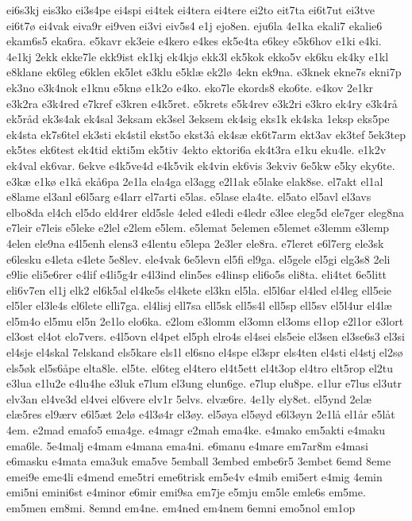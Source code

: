 {ei6s3kj
eis3ko
ei3s4pe
ei4spi
ei4tek
ei4tera
ei4tere
ei2to
eit7ta
ei6t7ut
ei3tve
ei6t7ø
ei4vak
eiva9r
ei9ven
ei3vi
eiv5s4
e1j
ejo8en.
eju6la
4e1ka
ekali7
ekalie6
ekam6s5
eka6ra.
e5kavr
ek3eie
e4kero
e4kes
ek5e4ta
e6key
e5k6hov
e1ki
e4ki.
4e1kj
2ekk
ekke7le
ekk9ist
ek1kj
ek4kjø
ekk3l
ek5kok
ekko5v
ek6ku
ek4ky
e1kl
e8klane
ek6leg
e6klen
ek5let
e3klu
e5klæ
ek2lø
4ekn
ek9na.
e3knek
ekne7s
ekni7p
ek3no
e3k4nok
e1knu
e5knø
e1k2o
e4ko.
eko7le
ekords8
eko6te.
e4kov
2e1kr
e3k2ra
e3k4red
e7kref
e3kren
e4k5ret.
e5krets
e5k4rev
e3k2ri
e3kro
ek4ry
e3k4rå
ek5råd
ek3s4ak
ek4sal
3eksam
ek3sel
3eksem
ek4sig
eks1k
ek4ska
1eksp
eks5pe
ek4sta
ek7s6tel
ek3sti
ek4stil
ekst5o
ekst3å
ek4sæ
ek6t7arm
ekt3av
ek3tef
5ek3tep
ek5tes
ek6test
ek4tid
ekti5m
ek5tiv
4ekto
ektori6a
ek4t3ra
e1ku
eku4le.
e1k2v
ek4val
ek6var.
6ekve
e4k5ve4d
e4k5vik
ek4vin
ek6vis
3ekviv
6e5kw
e5ky
eky6te.
e3kæ
e1kø
e1kå
ekå6pa
2e1la
ela4ga
el3agg
e2l1ak
e5lake
elak8se.
el7akt
el1al
e8lame
el3anl
e6l5arg
e4larr
el7arti
e5las.
e5lase
ela4te.
el5ato
el5avl
el3avs
elbo8da
el4ch
el5do
eld4rer
eld5sle
4eled
e4ledi
e4ledr
e3lee
eleg5d
ele7ger
eleg8na
e7leir
e7leis
e5leke
e2lel
e2lem
e5lem.
e5lemat
5elemen
e5lemet
e3lemm
e3lemp
4elen
ele9na
e4l5enh
elens3
e4lentu
e5lepa
2e3ler
ele8ra.
e7leret
e6l7erg
ele3sk
e6lesku
e4leta
e4lete
5e8lev.
ele4vak
6e5levn
el5fi
el9ga.
el5gele
el5gi
elg3s8
2eli
e9lie
eli5e6rer
e4lif
e4li5g4r
e4l3ind
elin5es
e4linsp
eli6o5s
eli8ta.
eli4tet
6e5litt
eli6v7en
el1j
elk2
el6k5al
el4ke5s
el4kete
el3kn
el5la.
el5l6ar
el4led
el4leg
ell5eie
el5ler
el3le4s
el6lete
elli7ga.
el4lisj
ell7sa
ell5sk
ell5s4l
ell5sp
ell5sv
el5l4ur
el4læ
el5m4o
el5mu
el5n
2e1lo
elo6ka.
e2lom
e3lomm
el3omn
el3oms
el1op
e2l1or
e3lort
el3ost
el4ot
elo7vers.
e4l5ovn
el4pet
el5ph
elro4s
el4sei
els5eie
el3sen
el3se6s3
el3si
el4sje
el4skal
7elskand
els5kare
els1l
el6sno
el4spe
el3spr
els4ten
el4sti
el4stj
el2sø
els5øk
el5s6åpe
elta8le.
el5te.
el6teg
el4tero
el4t5ett
el4t3op
el4tro
elt5rop
el2tu
e3lua
e1lu2e
e4lu4he
e3luk
e7lum
el3ung
elun6ge.
e7lup
elu8pe.
e1lur
e7lus
el3utr
elv3an
el4ve3d
el4vei
el6vere
elv1r
5elvs.
elvæ6re.
4e1ly
ely8et.
el5ynd
2elæ
elæ5res
el9ærv
e6l5æt
2elø
e4l3ø4r
el3øy.
el5øya
el5øyd
e6l3øyn
2e1lå
el1år
e5låt
4em.
e2mad
emafo5
ema4ge.
e4magr
e2mah
ema4ke.
e4mako
em5akti
e4maku
ema6le.
5e4malj
e4mam
e4mana
ema4ni.
e6manu
e4mare
em7ar8m
e4masi
e6masku
e4mata
ema3uk
ema5ve
5emball
3embed
embe6r5
3embet
6emd
8eme
emei9e
eme4li
e4mend
eme5tri
eme6trisk
em5e4v
e4mib
emi5ert
e4mig
4emin
emi5ni
emini6st
e4minor
e6mir
emi9sa
em7je
e5mju
em5le
emle6s
em5me.
em5men
em8mi.
8emnd
em4ne.
em4ned
em4nem
6emni
emo5nol
em1op
}
